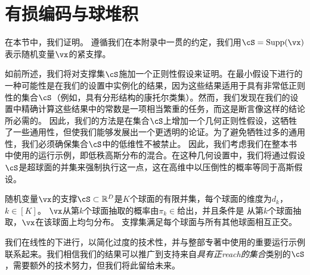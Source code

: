\documentclass[../../book-main_zh.tex]{subfiles}
\begin{document}
\section{有损编码与球堆积}\label{app:rate-distortion-covering}

在本节中，我们证明。
遵循我们在本附录中一贯的约定，我们用$\cS = \Supp(\vx)$表示随机变量$\vx$的紧支撑。

如前所述，我们将对支撑集$\cS$施加一个正则性假设来证明。在最小假设下进行的一种可能性是在我们的设置中实例化\cite{Riegler2018-jh,Riegler2023-rr}的结果，因为这些结果适用于具有非常低正则性的集合$\cS$（例如，具有分形结构的康托尔类集）。然而，我们发现在我们的设置中精确计算这些结果中的常数是一项相当繁重的任务，而这是断言像这样的结论所必需的。
因此，我们的方法是在集合$\cS$上增加一个几何正则性假设，这牺牲了一些通用性，但使我们能够发展出一个更透明的论证。为了避免牺牲过多的通用性，我们必须确保集合$\cS$中的低维性不被禁止。
因此，我们考虑我们在整本书中使用的运行示例，即低秩高斯分布的混合。在这种几何设置中，我们将通过假设$\cS$是超球面的并集来强制执行这一点，这在高维中以压倒性的概率等同于高斯假设。

\begin{assumption}\label{assumption:union-of-spheres}
    随机变量$\vx$的支撑$\cS \subset \R^D$是$K$个球面的有限并集，每个球面的维度为$d_k$，$k \in [K]$。
    $\vx$从第$k$个球面抽取的概率由$\pi_k \in$给出，并且条件是 从第$k$个球面抽取，$\vx$在该球面上均匀分布。
    支撑集满足每个球面与所有其他球面相互正交。
\end{assumption}

我们在线性的下进行，以简化过度的技术性，并与整部专著中使用的重要运行示例联系起来。我们相信我们的结果可以推广到支持来自\textit{具有正reach的集合}类别的$\cS$，需要额外的技术努力，但我们将此留给未来。
\end{document}
